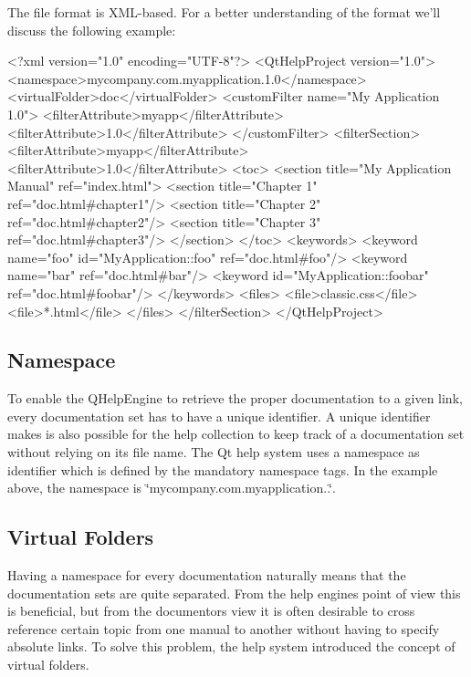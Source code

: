 The file format is X\-M\-L-\/based. For a better understanding of the format we'll discuss the following example\-: \begin{DoxyVerb}<?xml version="1.0" encoding="UTF-8"?>
<QtHelpProject version="1.0">
    <namespace>mycompany.com.myapplication.1.0</namespace>
    <virtualFolder>doc</virtualFolder>
    <customFilter name="My Application 1.0">
  <filterAttribute>myapp</filterAttribute>
  <filterAttribute>1.0</filterAttribute>
    </customFilter>
    <filterSection>
  <filterAttribute>myapp</filterAttribute>
  <filterAttribute>1.0</filterAttribute>
  <toc>
      <section title="My Application Manual" ref="index.html">
    <section title="Chapter 1" ref="doc.html#chapter1"/>
    <section title="Chapter 2" ref="doc.html#chapter2"/>
    <section title="Chapter 3" ref="doc.html#chapter3"/>
      </section>
  </toc>
  <keywords>
      <keyword name="foo" id="MyApplication::foo" ref="doc.html#foo"/>
      <keyword name="bar" ref="doc.html#bar"/>
      <keyword id="MyApplication::foobar" ref="doc.html#foobar"/>
  </keywords>
  <files>
      <file>classic.css</file>
      <file>*.html</file>
  </files>
    </filterSection>
</QtHelpProject>
\end{DoxyVerb}
\hypertarget{helpproject_helpproject-Namespace}{}\subsection{Namespace}\label{helpproject_helpproject-Namespace}
To enable the Q\-Help\-Engine to retrieve the proper documentation to a given link, every documentation set has to have a unique identifier. A unique identifier makes is also possible for the help collection to keep track of a documentation set without relying on its file name. The Qt help system uses a namespace as identifier which is defined by the mandatory namespace tags. In the example above, the namespace is \char`\"{}mycompany.\-com.\-myapplication..\char`\"{}.\hypertarget{helpproject_hp_virtualfolder}{}\subsection{Virtual Folders}\label{helpproject_hp_virtualfolder}
Having a namespace for every documentation naturally means that the documentation sets are quite separated. From the help engines point of view this is beneficial, but from the documentors view it is often desirable to cross reference certain topic from one manual to another without having to specify absolute links. To solve this problem, the help system introduced the concept of virtual folders.

